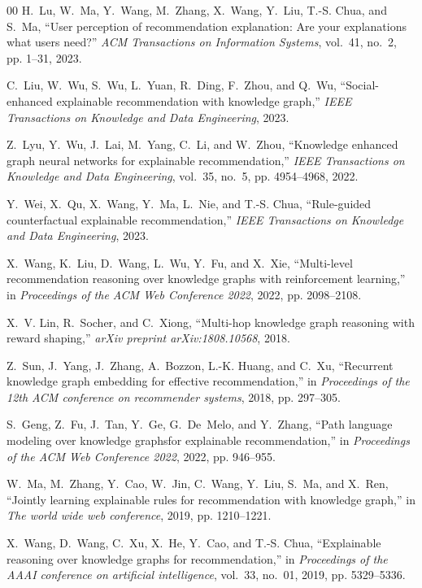 \documentclass[10pt,journal,compsoc]{IEEEtran}
\begin{document}
\begin{thebibliography}{00}
H.~Lu, W.~Ma, Y.~Wang, M.~Zhang, X.~Wang, Y.~Liu, T.-S. Chua, and S.~Ma, ``User perception of recommendation explanation: Are your explanations what users need?'' \emph{ACM Transactions on Information Systems}, vol.~41, no.~2, pp. 1--31, 2023.

C.~Liu, W.~Wu, S.~Wu, L.~Yuan, R.~Ding, F.~Zhou, and Q.~Wu, ``Social-enhanced explainable recommendation with knowledge graph,'' \emph{IEEE Transactions on Knowledge and Data Engineering}, 2023.

Z.~Lyu, Y.~Wu, J.~Lai, M.~Yang, C.~Li, and W.~Zhou, ``Knowledge enhanced graph neural networks for explainable recommendation,'' \emph{IEEE Transactions on Knowledge and Data Engineering}, vol.~35, no.~5, pp. 4954--4968, 2022.

Y.~Wei, X.~Qu, X.~Wang, Y.~Ma, L.~Nie, and T.-S. Chua, ``Rule-guided counterfactual explainable recommendation,'' \emph{IEEE Transactions on Knowledge and Data Engineering}, 2023.

X.~Wang, K.~Liu, D.~Wang, L.~Wu, Y.~Fu, and X.~Xie, ``Multi-level recommendation reasoning over knowledge graphs with reinforcement learning,'' in \emph{Proceedings of the ACM Web Conference 2022}, 2022, pp. 2098--2108.

X.~V. Lin, R.~Socher, and C.~Xiong, ``Multi-hop knowledge graph reasoning with reward shaping,'' \emph{arXiv preprint arXiv:1808.10568}, 2018.

Z.~Sun, J.~Yang, J.~Zhang, A.~Bozzon, L.-K. Huang, and C.~Xu, ``Recurrent knowledge graph embedding for effective recommendation,'' in \emph{Proceedings of the 12th ACM conference on recommender systems}, 2018, pp. 297--305.

S.~Geng, Z.~Fu, J.~Tan, Y.~Ge, G.~De~Melo, and Y.~Zhang, ``Path language modeling over knowledge graphsfor explainable recommendation,'' in \emph{Proceedings of the ACM Web Conference 2022}, 2022, pp. 946--955.


W.~Ma, M.~Zhang, Y.~Cao, W.~Jin, C.~Wang, Y.~Liu, S.~Ma, and X.~Ren, ``Jointly learning explainable rules for recommendation with knowledge graph,'' in \emph{The world wide web conference}, 2019, pp. 1210--1221.

X.~Wang, D.~Wang, C.~Xu, X.~He, Y.~Cao, and T.-S. Chua, ``Explainable reasoning over knowledge graphs for recommendation,'' in \emph{Proceedings of the AAAI conference on artificial intelligence}, vol.~33, no.~01, 2019, pp. 5329--5336.


\end{thebibliography}
\end{document}
